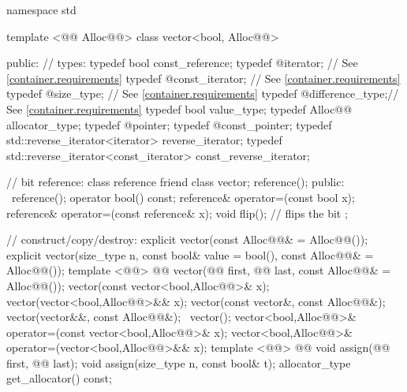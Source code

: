 \documentclass[american,twoside]{book}
\begin{document}
\begin{codeblock}
namespace std {
  template <@@ Alloc@@> class vector<bool, Alloc@@> {
  public:
    // types:
    typedef bool                                  const_reference;
    typedef @\impdef@                iterator;       // See \ref{container.requirements}
    typedef @\impdef@                const_iterator; // See \ref{container.requirements}
    typedef @\impdef@                size_type;      // See \ref{container.requirements}
    typedef @\impdef@                difference_type;// See \ref{container.requirements}
    typedef bool                                  value_type;
    typedef Alloc@@                             allocator_type;
    typedef @\impdef@                pointer;
    typedef @\impdef@                const_pointer;
    typedef std::reverse_iterator<iterator>       reverse_iterator;
    typedef std::reverse_iterator<const_iterator> const_reverse_iterator;

    // bit reference:
    class reference {
      friend class vector;
      reference();
    public:
      ~reference();
      operator bool() const;
      reference& operator=(const bool x);
      reference& operator=(const reference& x);
      void flip();              // flips the bit
    };

    // construct/copy/destroy:
    explicit vector(const Alloc@@& = Alloc@@());
    explicit vector(size_type n, const bool& value = bool(),
                    const Alloc@@& = Alloc@@());
    template <@@>
      @@
      vector(@@ first, @@ last,
             const Alloc@@& = Alloc@@());
    vector(const vector<bool,Alloc@@>& x);
    vector(vector<bool,Alloc@@>&& x);
    vector(const vector&, const Alloc@@&);
    vector(vector&&, const Alloc@@&);
   ~vector();
    vector<bool,Alloc@@>& operator=(const vector<bool,Alloc@@>& x);
    vector<bool,Alloc@@>& operator=(vector<bool,Alloc@@>&& x);
    template <@@>
      @@
      void assign(@@ first, @@ last);
    void assign(size_type n, const bool& t);
    allocator_type get_allocator() const;

}}
\end{codeblock}
\end{document}
